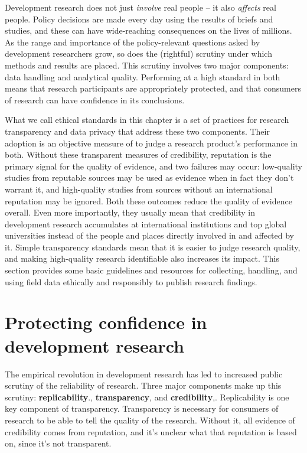 
\begin{fullwidth}
Development research does not just \textit{involve} real people -- it also \textit{affects} real people.
Policy decisions are made every day using the results of briefs and studies,
and these can have wide-reaching consequences on the lives of millions.
As the range and importance of the policy-relevant questions
asked by development researchers grow,
so does the (rightful) scrutiny under which methods and results are placed.
This scrutiny involves two major components: data handling and analytical quality.
Performing at a high standard in both means that research participants
are appropriately protected,
and that consumers of research can have confidence in its conclusions.

What we call ethical standards in this chapter is a set of practices for research transparency and data privacy that address these two components.
Their adoption is an objective measure of to judge a research product's performance in both.
Without these transparent measures of credibility, reputation is the primary signal for the quality of evidence, and two failures may occur:
low-quality studies from reputable sources may be used as evidence when in fact they don't warrant it,
and high-quality studies from sources without an international reputation may be ignored.
Both these outcomes reduce the quality of evidence overall.
Even more importantly, they usually mean that credibility in development research accumulates at international institutions and top global universities instead of the people and places directly involved in and affected by it.
Simple transparency standards mean that it is easier to judge research quality, and making high-quality research identifiable also increases its impact.
This section provides some basic guidelines and resources for collecting, handling, and using field data ethically and responsibly to publish research findings.
\end{fullwidth}


\section{Protecting confidence in development research}

The empirical revolution in development research
has led to increased public scrutiny of the reliability of research.\cite{rogers_2017}
Three major components make up this scrutiny: \textbf{replicability}.\cite{duvendack2017meant}, \textbf{transparency},\cite{christensen2018transparency} and \textbf{credibility},\cite{ioannidis2017power}.
Replicability is one key component of transparency.
Transparency is necessary for consumers of research
to be able to tell the quality of the research.
Without it, all evidence of credibility comes from reputation,
and it's unclear what that reputation is based on, since it's not transparent.

